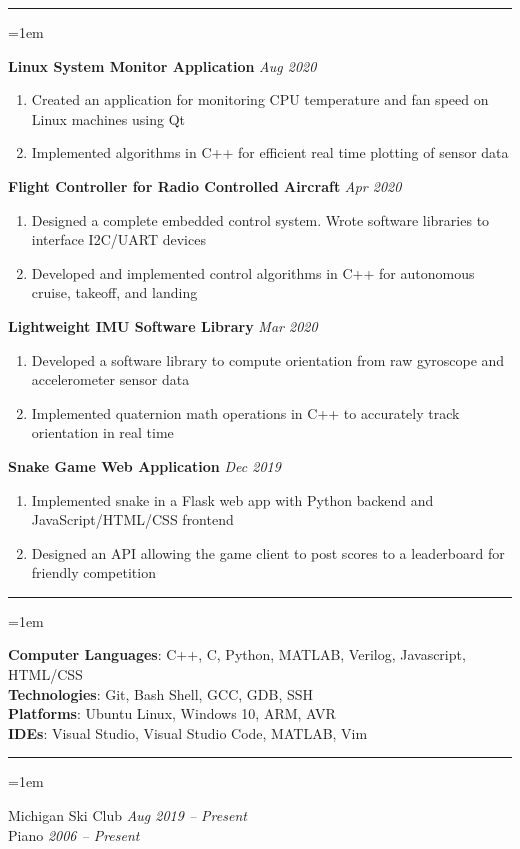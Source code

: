 \documentclass[12pt]{article}
\newcommand{\rheader}[1] { 
    \noindent{ 
        \large 
        \textbf{#1} 
        \par 
    }
    \vspace{-10pt}
    \noindent 
    \rule{7.5in}{0.5pt} 
}
\newcommand{\rdate}[1] {
    \hfill 
    \textit{#1}
}
\newcommand{\ritem} {
    \vspace{-10pt} 
    \item
}
\newenvironment{rsection} {
    \vspace{-5pt}
    \par 
    \medskip
    \leftskip=1em
    \noindent 
    \ignorespaces
} {
    \par 
    \medskip
    \vspace{5pt}
}
\newenvironment{rlist} {
    \begin{enumerate}[leftmargin=0.5in, label=$\bullet$]
} {
    \end{enumerate}
    \vspace{-10pt}
}
\begin{document}
\rheader{PROJECTS}
\begin{rsection}
    \textbf{Linux System Monitor Application} \rdate{Aug 2020}
    \begin{rlist}
        \ritem Created an application for monitoring CPU temperature and fan speed on Linux machines using Qt
        \ritem Implemented algorithms in C++ for efficient real time plotting of sensor data
    \end{rlist}
    \vspace{5pt}
    \textbf{Flight Controller for Radio Controlled Aircraft}  \rdate{Apr 2020}
    \begin{rlist}
        \ritem Designed a complete embedded control system. Wrote software libraries to interface I2C/UART devices
        \ritem Developed and implemented control algorithms in C++ for autonomous cruise, takeoff, and landing
    \end{rlist}
    \vspace{5pt}
    \textbf{Lightweight IMU Software Library} \rdate{Mar 2020}
    \begin{rlist}
        \ritem Developed a software library to compute orientation from raw gyroscope and accelerometer sensor data
        \ritem Implemented quaternion math operations in C++ to accurately track orientation in real time
    \end{rlist}
    \vspace{5pt}
    \textbf{Snake Game Web Application} \rdate{Dec 2019}
    \begin{rlist}
        \ritem Implemented snake in a Flask web app with Python backend and JavaScript/HTML/CSS frontend
        \ritem Designed an API allowing the game client to post scores to a leaderboard for friendly competition
    \end{rlist}
\end{rsection}


\rheader{SKILLS}
\begin{rsection}
    \textbf{Computer Languages}: C++, C, Python, MATLAB, Verilog, Javascript, HTML/CSS \\
    \textbf{Technologies}: Git, Bash Shell, GCC, GDB, SSH \\
    \textbf{Platforms}: Ubuntu Linux, Windows 10, ARM, AVR \\
    \textbf{IDEs}: Visual Studio, Visual Studio Code, MATLAB, Vim
\end{rsection}


\rheader{ACTIVITIES}
\begin{rsection}
    Michigan Ski Club \rdate{Aug 2019 -- Present} \\
    Piano \rdate{2006 -- Present}
\end{rsection}
\end{document}
